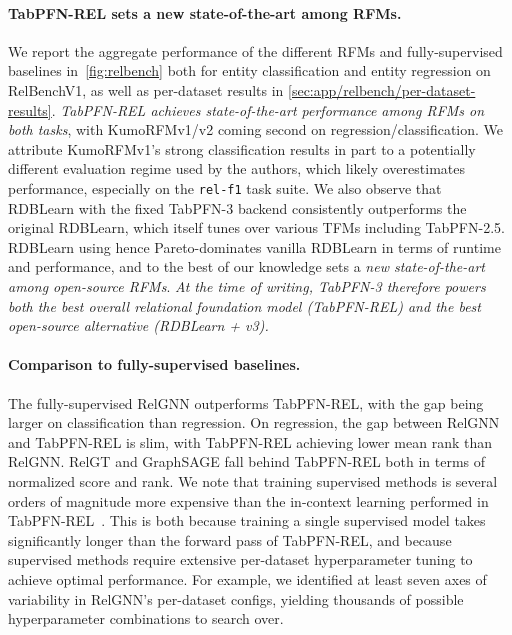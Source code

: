 \paragraph{TabPFN-REL sets a new state-of-the-art among RFMs.} We report the aggregate performance of the different RFMs and fully-supervised baselines in~\autoref{fig:relbench} both for entity classification and entity regression on RelBenchV1, as well as per-dataset results in \autoref{sec:app/relbench/per-dataset-results}. \textit{TabPFN-REL achieves state-of-the-art performance among RFMs on both tasks}, with KumoRFMv1/v2 coming second on regression/classification. We attribute KumoRFMv1's strong classification results in part to a potentially different evaluation regime used by the authors, which likely overestimates performance, especially on the \texttt{rel-f1} task suite. We also observe that RDBLearn with the fixed TabPFN-3 backend consistently outperforms the original RDBLearn, which itself tunes over various TFMs including TabPFN-2.5. RDBLearn using \ourmodel hence Pareto-dominates vanilla RDBLearn in terms of runtime and performance, and to the best of our knowledge sets a \textit{new state-of-the-art among open-source RFMs}. \textit{At the time of writing, TabPFN-3 therefore powers both the best overall relational foundation model (TabPFN-REL) and the best open-source alternative (RDBLearn + v3).}

\paragraph{Comparison to fully-supervised baselines.} The fully-supervised RelGNN outperforms TabPFN-REL, with the gap being larger on classification than regression. On regression, the gap between RelGNN and TabPFN-REL is slim, with TabPFN-REL achieving lower mean rank than RelGNN. RelGT and GraphSAGE fall behind TabPFN-REL both in terms of normalized score and rank. We note that training supervised methods is several orders of magnitude more expensive than the in-context learning performed in TabPFN-REL~\cite{rdblearn, kumorfmv1, kumorfmv2}. This is both because training a single supervised model takes significantly longer than the forward pass of TabPFN-REL, and because supervised methods require extensive per-dataset hyperparameter tuning to achieve optimal performance. For example, we identified at least seven axes of variability in RelGNN's per-dataset configs, yielding thousands of possible hyperparameter combinations to search over.

\FloatBarrier

